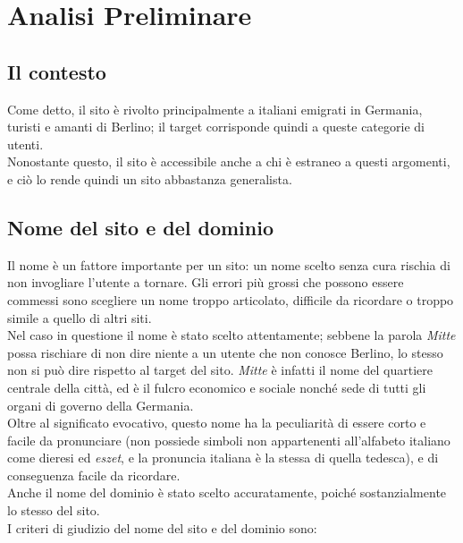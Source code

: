 \section{Analisi Preliminare}
\subsection{Il contesto}
Come detto, il sito è rivolto principalmente a italiani emigrati in Germania, turisti e amanti di Berlino; il target corrisponde quindi a queste categorie di utenti. \\ 
Nonostante questo, il sito è accessibile anche a chi è estraneo a questi argomenti, e ciò lo rende quindi un sito abbastanza generalista.

\subsection{Nome del sito e del dominio}
Il nome è un fattore importante per un sito: un nome scelto senza cura rischia di non invogliare l'utente a tornare. Gli errori più grossi che possono essere commessi sono scegliere un nome troppo articolato, difficile da ricordare o troppo simile a quello di altri siti. \\
Nel caso in questione il nome è stato scelto attentamente; sebbene la parola \textit{Mitte} possa rischiare di non dire niente a un utente che non conosce Berlino, lo stesso non si può dire rispetto al target del sito. \textit{Mitte} è infatti il nome del quartiere centrale della città, ed è il fulcro economico e sociale nonché sede di tutti gli organi di governo della Germania. \\
Oltre al significato evocativo, questo nome ha la peculiarità di essere corto e facile da pronunciare (non possiede simboli non appartenenti all'alfabeto italiano come dieresi ed \textit{eszet}, e la pronuncia italiana è la stessa di quella tedesca), e di conseguenza facile da ricordare. \\
Anche il nome del dominio è stato scelto accuratamente, poiché sostanzialmente lo stesso del sito. \\
I criteri di giudizio del nome del sito e del dominio sono:
